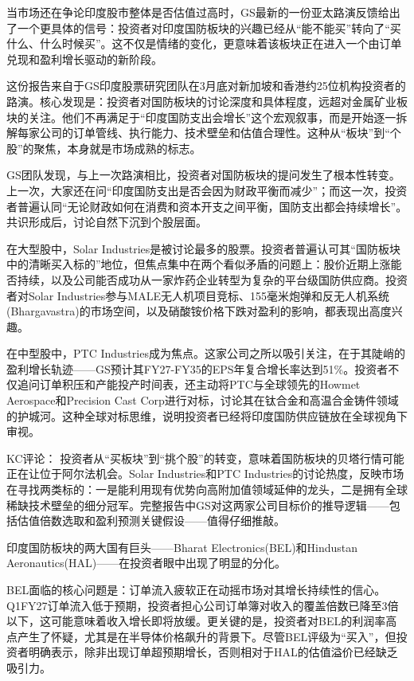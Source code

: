 \documentclass[11pt]{ctexart}
\begin{document}
当市场还在争论印度股市整体是否估值过高时，GS最新的一份亚太路演反馈给出了一个更具体的信号：投资者对印度国防板块的兴趣已经从“能不能买”转向了“买什么、什么时候买”。这不仅是情绪的变化，更意味着该板块正在进入一个由订单兑现和盈利增长驱动的新阶段。

这份报告来自于GS印度股票研究团队在3月底对新加坡和香港约25位机构投资者的路演。核心发现是：投资者对国防板块的讨论深度和具体程度，远超对金属矿业板块的关注。他们不再满足于“印度国防支出会增长”这个宏观叙事，而是开始逐一拆解每家公司的订单管线、执行能力、技术壁垒和估值合理性。这种从“板块”到“个股”的聚焦，本身就是市场成熟的标志。

GS团队发现，与上一次路演相比，投资者对国防板块的提问发生了根本性转变。上一次，大家还在问“印度国防支出是否会因为财政平衡而减少”；而这一次，投资者普遍认同“无论财政如何在消费和资本开支之间平衡，国防支出都会持续增长”。共识形成后，讨论自然下沉到个股层面。

在大型股中，Solar Industries是被讨论最多的股票。投资者普遍认可其“国防板块中的清晰买入标的”地位，但焦点集中在两个看似矛盾的问题上：股价近期上涨能否持续，以及公司能否成功从一家炸药企业转型为复杂的平台级国防供应商。投资者对Solar Industries参与MALE无人机项目竞标、155毫米炮弹和反无人机系统(Bhargavastra)的市场空间，以及硝酸铵价格下跌对盈利的影响，都表现出高度兴趣。

在中型股中，PTC Industries成为焦点。这家公司之所以吸引关注，在于其陡峭的盈利增长轨迹——GS预计其FY27-FY35的EPS年复合增长率达到51\%。投资者不仅追问订单积压和产能投产时间表，还主动将PTC与全球领先的Howmet Aerospace和Precision Cast Corp进行对标，讨论其在钛合金和高温合金铸件领域的护城河。这种全球对标思维，说明投资者已经将印度国防供应链放在全球视角下审视。

KC评论： 投资者从“买板块”到“挑个股”的转变，意味着国防板块的贝塔行情可能正在让位于阿尔法机会。Solar Industries和PTC Industries的讨论热度，反映市场在寻找两类标的：一是能利用现有优势向高附加值领域延伸的龙头，二是拥有全球稀缺技术壁垒的细分冠军。完整报告中GS对这两家公司目标价的推导逻辑——包括估值倍数选取和盈利预测关键假设——值得仔细推敲。

印度国防板块的两大国有巨头——Bharat Electronics(BEL)和Hindustan Aeronautics(HAL)——在投资者眼中出现了明显的分化。

BEL面临的核心问题是：订单流入疲软正在动摇市场对其增长持续性的信心。Q1FY27订单流入低于预期，投资者担心公司订单簿对收入的覆盖倍数已降至3倍以下，这可能意味着收入增长即将放缓。更关键的是，投资者对BEL的利润率高点产生了怀疑，尤其是在半导体价格飙升的背景下。尽管BEL评级为“买入”，但投资者明确表示，除非出现订单超预期增长，否则相对于HAL的估值溢价已经缺乏吸引力。
\end{document}
